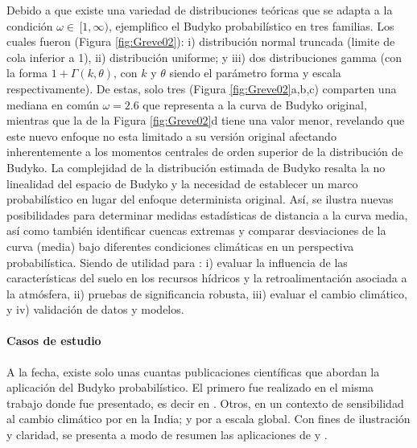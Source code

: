 \documentclass[12pt]{article}
\begin{document}
Debido a que existe una variedad de distribuciones teóricas que se adapta a la condición $\omega \in\,[1,\infty)$, \citet{Greve2015} ejemplifico el Budyko probabilístico en tres familias. Los cuales fueron (Figura \ref{fig:Greve02}): i) distribución normal truncada (limite de cola inferior a 1), ii) distribución uniforme; y iii) dos distribuciones gamma (con la forma $1 + \Gamma (k, \theta )$, con $k$ y $\theta$ siendo el parámetro forma y escala respectivamente). De estas, solo tres (Figura \ref{fig:Greve02}a,b,c) comparten una mediana en común $\omega = 2.6$ que representa a la curva de Budyko original, mientras que la de la Figura \ref{fig:Greve02}d tiene una valor menor, revelando que este nuevo enfoque no esta limitado a su versión original afectando inherentemente a los momentos centrales de orden superior de la distribución de Budyko. La complejidad de la distribución estimada de Budyko resalta la no linealidad del espacio de Budyko y la necesidad de establecer un marco probabilístico en lugar del enfoque determinista original. Así, se ilustra nuevas posibilidades para determinar medidas estadísticas de distancia a la curva media, así como también identificar cuencas extremas y comparar desviaciones de la curva (media) bajo diferentes condiciones climáticas en un perspectiva probabilística. Siendo de utilidad para : i) evaluar la influencia de las características del suelo en los recursos hídricos y la retroalimentación asociada a la atmósfera, ii) pruebas de significancia robusta, iii) evaluar el cambio climático, y iv) validación de datos y modelos.


\thispagestyle{empty}

\paragraph{Casos de estudio}\mbox{}

A la fecha, existe solo unas cuantas publicaciones científicas que abordan la aplicación del Budyko probabilístico. El primero fue realizado en el misma trabajo donde fue presentado, es decir en \citet{Greve2015}. Otros, en un contexto de sensibilidad al cambio climático por \cite{Singh2015} en la India; y por \citet{gudmundsson2016sensitivity} a escala global. Con fines de ilustración y claridad, se presenta a modo de resumen las aplicaciones de \citet{Greve2015} y \citet{Singh2015}.


\clearpage

\clearpage
\end{document}
